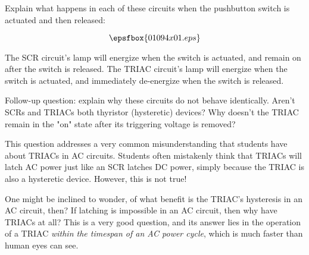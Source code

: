 

Explain what happens in each of these circuits when the pushbutton switch is actuated and then released:

$$\epsfbox{01094x01.eps}$$







The SCR circuit's lamp will energize when the switch is actuated, and remain on after the switch is released.  The TRIAC circuit's lamp will energize when the switch is actuated, and immediately de-energize when the switch is released.

\vskip 10pt

Follow-up question: explain why these circuits do not behave identically.  Aren't SCRs and TRIACs both thyristor (hysteretic) devices?  Why doesn't the TRIAC remain in the "on" state after its triggering voltage is removed?







This question addresses a very common misunderstanding that students have about TRIACs in AC circuits.  Students often mistakenly think that TRIACs will latch AC power just like an SCR latches DC power, simply because the TRIAC is also a hysteretic device.  However, this is not true!

One might be inclined to wonder, of what benefit is the TRIAC's hysteresis in an AC circuit, then?  If latching is impossible in an AC circuit, then why have TRIACs at all?  This is a very good question, and its answer lies in the operation of a TRIAC {\it within the timespan of an AC power cycle}, which is much faster than human eyes can see.




